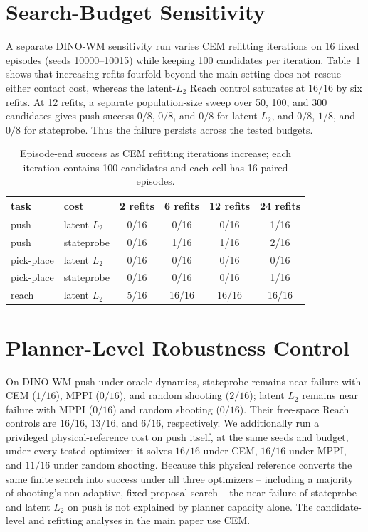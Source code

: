 \documentclass[10pt]{article}
\begin{document}
\section{Search-Budget Sensitivity}\label{app:budget}

A separate DINO-WM sensitivity run varies CEM refitting iterations on 16 fixed
episodes (seeds 10000--10015) while keeping 100 candidates per iteration.
Table~\ref{tab:budget} shows that increasing refits fourfold beyond the main
setting does not rescue either contact cost, whereas the latent-$L_2$ Reach
control saturates at $16/16$ by six refits. At 12 refits, a separate
population-size sweep over 50, 100, and 300 candidates gives push success
$0/8$, $0/8$, and $0/8$ for latent $L_2$, and $0/8$, $1/8$, and $0/8$ for
stateprobe. Thus the failure persists across the tested budgets.

\begin{table}[ht]
\centering
\small
\caption{Episode-end success as CEM refitting iterations increase; each
iteration contains 100 candidates and each cell has 16 paired episodes.}
\label{tab:budget}
\begin{tabular}{llcccc}
\toprule
task & cost & 2 refits & 6 refits & 12 refits & 24 refits \\
\midrule
push & latent $L_2$ & 0/16 & 0/16 & 0/16 & 1/16 \\
push & stateprobe & 0/16 & 1/16 & 1/16 & 2/16 \\
pick-place & latent $L_2$ & 0/16 & 0/16 & 0/16 & 0/16 \\
pick-place & stateprobe & 0/16 & 0/16 & 0/16 & 1/16 \\
reach & latent $L_2$ & 5/16 & 16/16 & 16/16 & 16/16 \\
\bottomrule
\end{tabular}
\end{table}

\section{Planner-Level Robustness Control}\label{app:planner}

On DINO-WM push under oracle dynamics, stateprobe remains near failure with CEM
($1/16$), MPPI ($0/16$), and random shooting ($2/16$); latent $L_2$ remains near
failure with MPPI ($0/16$) and random shooting ($0/16$). Their free-space Reach
controls are $16/16$, $13/16$, and $6/16$, respectively. We additionally run a
privileged physical-reference cost on push itself, at the same seeds and
budget, under every tested optimizer: it solves $16/16$ under CEM, $16/16$
under MPPI, and $11/16$ under random shooting. Because this physical reference
converts the same finite search into success under all three optimizers --
including a majority of shooting's non-adaptive, fixed-proposal search -- the
near-failure of stateprobe and latent $L_2$ on push is not explained by
planner capacity alone. The candidate-level and refitting analyses in the
main paper use CEM.
\end{document}
